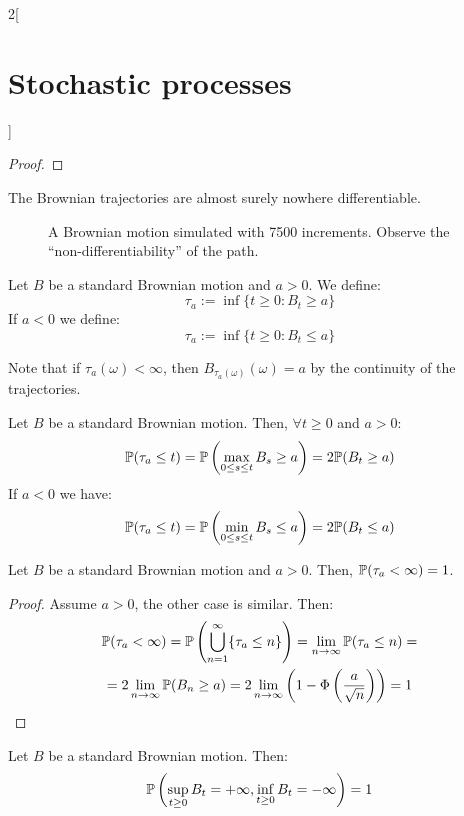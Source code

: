 \documentclass[../../../main_math.tex]{subfiles}
\begin{document}
\begin{multicols}{2}[\section{Stochastic processes}]
\begin{proof}
  \end{proof}
  \begin{theorem}
    The Brownian trajectories are almost surely nowhere differentiable.
  \end{theorem}
  \begin{figure}[H]
    \centering
    
    \caption{A Brownian motion simulated with 7500 increments. Observe the ``non-differentiability'' of the path.}
    \label{fig:BrownianMotion}
  \end{figure}
  \begin{definition}
    Let $B$ be a standard Brownian motion and $a>0$. We define:
    $$
      \tau_a:=\inf\{t\geq 0:B_t\geq a\}
    $$
    If $a<0$ we define: $$\tau_a:=\inf\{t\geq 0:B_t\leq a\}$$
  \end{definition}
  \begin{remark}
    Note that if $\tau_a(\omega)<\infty$, then $B_{\tau_a(\omega)}(\omega)=a$ by the continuity of the trajectories.
  \end{remark}
  \begin{lemma}\label{SP:distrTauA}
    Let $B$ be a standard Brownian motion. Then, $\forall t\geq 0$ and $a>0$:
    $$
      \mathbb{P}(\tau_a\leq t)=\mathbb{P}\left(\max_{0\leq s\leq t}B_s\geq a\right)=2\mathbb{P}(B_t\geq a)
    $$
    If $a<0$ we have:
    $$
      \mathbb{P}(\tau_a\leq t)=\mathbb{P}\left(\min_{0\leq s\leq t}B_s\leq a\right)=2\mathbb{P}(B_t\leq a)
    $$
  \end{lemma}
  \begin{corollary}
    Let $B$ be a standard Brownian motion and $a>0$. Then, $\mathbb{P}(\tau_a<\infty)=1$.
  \end{corollary}
  \begin{proof}
    Assume $a>0$, the other case is similar. Then:
    \begin{multline*}
      \mathbb{P}(\tau_a<\infty)=\mathbb{P}\left(\bigcup_{n=1}^\infty\{\tau_a\leq n\}\right)=\lim_{n\to\infty}\mathbb{P}(\tau_a\leq n)=\\
      =2\lim_{n\to\infty}\mathbb{P}(B_n\geq a)=2\lim_{n\to\infty}\left(1-\Phi\left(\frac{a}{\sqrt{n}}\right)\right)=1
    \end{multline*}
  \end{proof}
  \begin{proposition}
    Let $B$ be a standard Brownian motion. Then:
    $$
      \mathbb{P}\left(\sup_{t\geq 0}B_t=+\infty,\inf_{t\geq 0}B_t=-\infty\right)=1
    $$
  \end{proposition}

\end{multicols}
\end{document}

